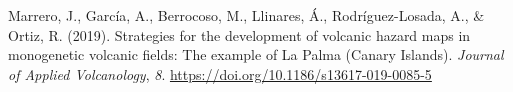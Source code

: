 \documentclass[
]{agujournal2019}
\newlength{\cslhangindent}
\newenvironment{CSLReferences}[2] %
 {\begin{list}{}{%
  \setlength{\itemindent}{0pt}
  \setlength{\leftmargin}{0pt}
  \setlength{\parsep}{0pt}
  \ifodd #1
   \setlength{\leftmargin}{\cslhangindent}
   \setlength{\itemindent}{-1\cslhangindent}
  \fi
  \setlength{\itemsep}{#2\baselineskip}}}
 {\end{list}}
\begin{document}
\label{refs}
\begin{CSLReferences}{1}{0}
\vspace{1em}

Marrero, J., García, A., Berrocoso, M., Llinares, Á., Rodríguez-Losada,
A., \& Ortiz, R. (2019). Strategies for the development of volcanic
hazard maps in monogenetic volcanic fields: The example of {La} {Palma}
({Canary} {Islands}). \emph{Journal of Applied Volcanology}, \emph{8}.
\url{https://doi.org/10.1186/s13617-019-0085-5}

\end{CSLReferences}
\end{document}
